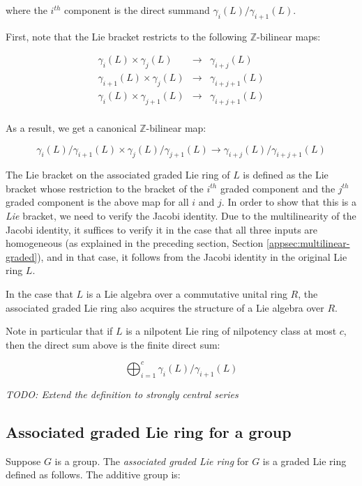 \documentclass{ucetd}
\begin{document}
where the $i^{th}$ component is the direct summand
$\gamma_i(L)/\gamma_{i+1}(L)$.

First, note that the Lie bracket restricts to the following
$\mathbb{Z}$-bilinear maps:

\begin{eqnarray*}
  \gamma_i(L) \times \gamma_j(L) & \to & \gamma_{i+j}(L)\\
  \gamma_{i+1}(L) \times \gamma_j(L) & \to & \gamma_{i+j+1}(L)\\
  \gamma_i(L) \times \gamma_{j+1}(L) & \to & \gamma_{i+j+1}(L)\\
\end{eqnarray*}

As a result, we get a canonical $\mathbb{Z}$-bilinear map:

$$\gamma_i(L)/\gamma_{i+1}(L) \times \gamma_j(L)/\gamma_{j+1}(L) \to \gamma_{i+j}(L)/\gamma_{i+j+1}(L)$$

The Lie bracket on the associated graded Lie ring of $L$ is defined as
the Lie bracket whose restriction to the bracket of the $i^{th}$
graded component and the $j^{th}$ graded component is the above map
for all $i$ and $j$. In order to show that this is a {\em Lie}
bracket, we need to verify the Jacobi identity. Due to the
multilinearity of the Jacobi identity, it suffices to verify it in the
case that all three inputs are homogeneous (as explained in the
preceding section, Section \ref{appsec:multilinear-graded}), and in
that case, it follows from the Jacobi identity in the original Lie
ring $L$.

In the case that $L$ is a Lie algebra over a commutative unital ring
$R$, the associated graded Lie ring also acquires the structure of a
Lie algebra over $R$.

Note in particular that if $L$ is a nilpotent Lie ring of nilpotency
class at most $c$, then the direct sum above is the finite direct sum:

$$\bigoplus_{i=1}^c \gamma_i(L)/\gamma_{i+1}(L)$$

{\em TODO: Extend the definition to strongly central series}

\subsection{Associated graded Lie ring for a group}

Suppose $G$ is a group. The {\em associated graded Lie ring} for $G$
is a graded Lie ring defined as follows. The additive group is:
\end{document}
